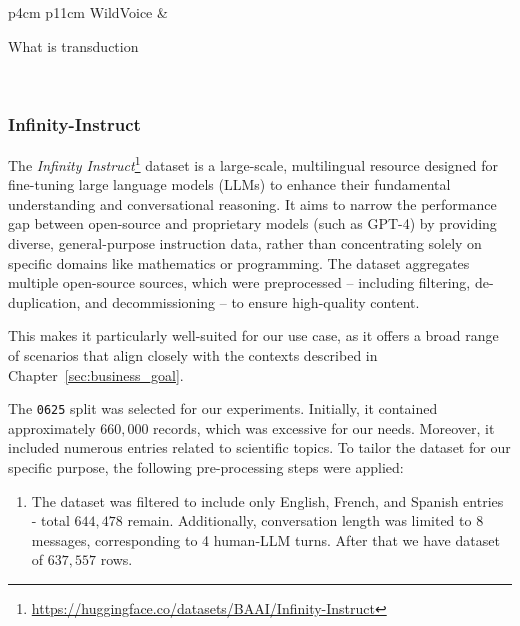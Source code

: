 \begin{appendices}
\begin{table}[t!]
\begin{tabular}{p{4cm} p{11cm}}
    WildVoice & \parbox[t]{\linewidth}{What is transduction} \\

    \bottomrule
    \end{tabular}
    \label{tab:experiments__datasets__voice_bench__multi_sentence__sample}
    \end{table}

    \subsubsection{Infinity-Instruct}
    \label{subsec:experiments__datasets__infinity_instruct}

    The \textit{Infinity Instruct}\footnote{\url{https://huggingface.co/datasets/BAAI/Infinity-Instruct}} \parencite{li2025infinityinstruct} dataset is a large-scale, multilingual resource designed for fine-tuning large language models (LLMs) to enhance their fundamental understanding and conversational reasoning. It aims to narrow the performance gap between open-source and proprietary models (such as GPT-4) by providing diverse, general-purpose instruction data, rather than concentrating solely on specific domains like mathematics or programming. The dataset aggregates multiple open-source sources, which were preprocessed -- including filtering, de-duplication, and decommissioning -- to ensure high-quality content.

    This makes it particularly well-suited for our use case, as it offers a broad range of scenarios that align closely with the contexts described in Chapter~\ref{sec:business_goal}.

    The \texttt{0625} split was selected for our experiments. Initially, it contained approximately $660{,}000$ records, which was excessive for our needs. Moreover, it included numerous entries related to scientific topics. To tailor the dataset for our specific purpose, the following pre-processing steps were applied:

    \begin{enumerate}

        \item The dataset was filtered to include only English, French, and Spanish entries - total $644,478$ remain. Additionally, conversation length was limited to 8 messages, corresponding to 4 human-LLM turns. After that we have dataset of $637,557$ rows.


\end{enumerate}
\end{appendices}
